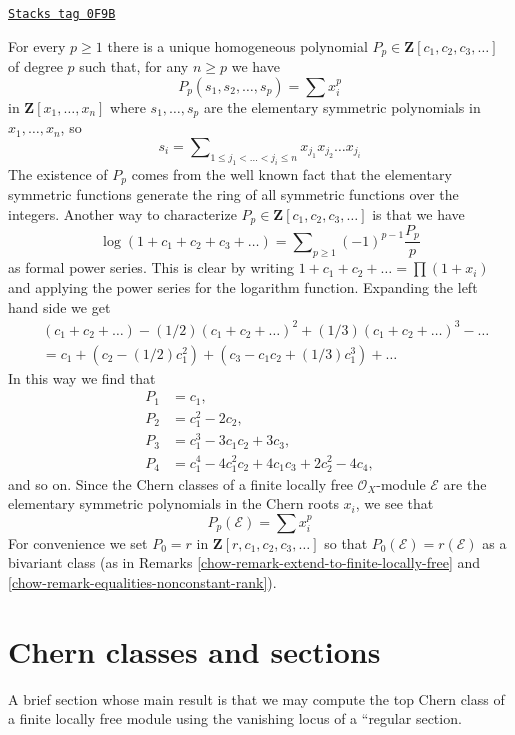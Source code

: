 \begin{example}
\label{chow-example-power-sum}
\href{https://stacks.math.columbia.edu/tag/0F9B}{\texttt{Stacks tag 0F9B}}

For every $p \geq 1$ there is a unique homogeneous polynomial
$P_p \in \mathbf{Z}[c_1, c_2, c_3, \ldots]$ of degree $p$
such that, for any $n \geq p$ we have
$$
P_p(s_1, s_2, \ldots, s_p) = \sum x_i^p
$$
in $\mathbf{Z}[x_1, \ldots, x_n]$ where $s_1, \ldots, s_p$ are the
elementary symmetric polynomials in $x_1, \ldots, x_n$, so
$$
s_i = \sum\nolimits_{1 \leq j_1 < \ldots < j_i \leq n}
x_{j_1}x_{j_2} \ldots x_{j_i}
$$
The existence of $P_p$ comes from the well known fact that
the elementary symmetric functions generate the ring of
all symmetric functions over the integers. Another way to
characterize $P_p \in \mathbf{Z}[c_1, c_2, c_3, \ldots]$ is that we have
$$
\log(1 + c_1 + c_2 + c_3 + \ldots) =
\sum\nolimits_{p \geq 1} (-1)^{p - 1}\frac{P_p}{p}
$$
as formal power series. This is clear by writing
$1 + c_1 + c_2 + \ldots = \prod (1 + x_i)$ and applying
the power series for the logarithm function. Expanding the left
hand side we get
\begin{align*}
& (c_1 + c_2 + \ldots) - (1/2)(c_1 + c_2 + \ldots)^2 +
(1/3)(c_1 + c_2 + \ldots)^3 - \ldots \\
& =
c_1 + (c_2 - (1/2)c_1^2) + (c_3 - c_1c_2 + (1/3)c_1^3) + \ldots
\end{align*}
In this way we find that
\begin{align*}
P_1 & = c_1, \\
P_2 & = c_1^2 - 2c_2, \\
P_3 & = c_1^3 - 3c_1c_2 + 3c_3, \\
P_4 & = c_1^4 - 4c_1^2c_2 + 4c_1c_3 + 2c_2^2 - 4c_4,
\end{align*}
and so on. Since the Chern classes of a finite locally free
$\mathcal{O}_X$-module $\mathcal{E}$ are the elementary symmetric
polynomials in the Chern roots $x_i$, we see that
$$
P_p(\mathcal{E}) = \sum x_i^p
$$
For convenience we set $P_0 = r$ in $\mathbf{Z}[r, c_1, c_2, c_3, \ldots]$
so that $P_0(\mathcal{E}) = r(\mathcal{E})$ as a bivariant class
(as in Remarks \ref{chow-remark-extend-to-finite-locally-free} and
\ref{chow-remark-equalities-nonconstant-rank}).
\end{example}

\section{Chern classes and sections}
\label{chow-section-top-chern-class}
A brief section whose main result is that we may compute the
top Chern class of a finite locally free module using the
vanishing locus of a ``regular section.

